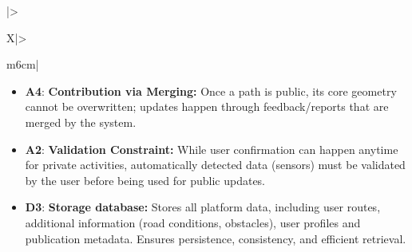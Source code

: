 \begin{table}[H]
\begin{tabularx}{\textwidth}{|>{\raggedright\arraybackslash}X|>{\raggedright\arraybackslash}m{6cm}|}
\begin{minipage}[t]{\linewidth}
        \begin{itemize}[leftmargin=*, nosep, label={}]
            \item \textbf{A4}: \textbf{Contribution via Merging:} Once a path is public, its core geometry cannot be overwritten; updates happen through feedback/reports that are merged by the system.
            \item \textbf{A2}: \textbf{Validation Constraint:} While user confirmation can happen anytime for private activities, automatically detected data (sensors) must be validated by the user before being used for public updates.
            \item \textbf{D3}: \textbf{Storage database:} Stores all platform data, including user routes, additional information (road conditions, obstacles), user profiles and publication metadata. Ensures persistence, consistency, and efficient retrieval.
        \end{itemize}
        \end{minipage}
        \\ \hline
    \end{tabularx}
    \caption{Requirement Mapping for G5}
    \label{tab:mapping_g5}
\end{table}